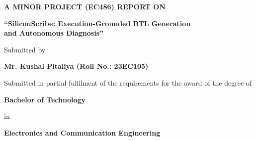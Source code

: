 \documentclass[a4paper,11pt,oneside]{book}
\begin{document}

    \frontmatter

    \begin{titlepage}
       \begin{center}

       \vspace*{0.5cm}

        {\fontsize{15}{17}\selectfont\bfseries
        A MINOR PROJECT (EC486) REPORT ON
        }

        \vspace{0.6cm}

        {\fontsize{13}{15}\selectfont\bfseries
        ``SiliconScribe: Execution-Grounded RTL Generation\\[2pt] and Autonomous Diagnosis''
        }

        \vspace{0.8cm}

        {\fontsize{12}{14}\selectfont
        Submitted by
        }

        \vspace{0.3cm}

        {\fontsize{13}{15}\selectfont\bfseries
        Mr. Kushal Pitaliya (Roll No.: 23EC105)
        }

        \vspace{0.8cm}

        {\fontsize{11}{13}\selectfont
        Submitted in partial fulfilment of the requirements for the award of the degree of
        }

        \vspace{0.3cm}

        {\fontsize{13}{15}\selectfont\bfseries
        Bachelor of Technology
        }

        \vspace{0.3cm}

        {\fontsize{11}{13}\selectfont
        in
        }

        \vspace{0.3cm}

        {\fontsize{13}{15}\selectfont\bfseries
        Electronics and Communication Engineering
        }


\end{center}
\end{titlepage}
\end{document}
